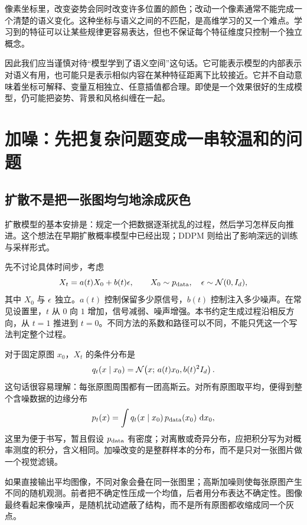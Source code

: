 像素坐标里，改变姿势会同时改变许多位置的颜色；改动一个像素通常不能完成一个清楚的语义变化。这种坐标与语义之间的不匹配，是高维学习的又一个难点。学习到的特征可以让某些规律更容易表达，但也不保证每个特征维度只控制一个独立概念。

因此我们应当谨慎对待“模型学到了语义空间”这句话。它可能表示模型的内部表示对语义有用，也可能只是表示相似内容在某种特征距离下比较接近。它并不自动意味着坐标可解释、变量互相独立、任意插值都合理。即使是一个效果很好的生成模型，仍可能把姿势、背景和风格纠缠在一起。

\section{加噪：先把复杂问题变成一串较温和的问题}
\label{sec:c-noising}

\subsection{扩散不是把一张图均匀地涂成灰色}

扩散模型的基本安排是：规定一个把数据逐渐扰乱的过程，然后学习怎样反向推进。这个想法在早期扩散概率模型中已经出现；DDPM 则给出了影响深远的训练与采样形式。\cite{c_sohl2015diffusion,r_ddpm}

先不讨论具体时间步，考虑
\begin{equation}
  X_t=a(t)X_0+b(t)\epsilon,\qquad
  X_0\sim p_{\mathrm{data}},\quad \epsilon\sim\mathcal{N}(0,I_d),
  \label{eq:c-noising}
\end{equation}
其中 $X_0$ 与 $\epsilon$ 独立。$a(t)$ 控制保留多少原信号，$b(t)$ 控制注入多少噪声。在常见设置里，$t$ 从 $0$ 向 $1$ 增加，信号减弱、噪声增强。本书约定生成过程沿相反方向，从 $t=1$ 推进到 $t=0$。不同方法的系数和路径可以不同，不能只凭这一个写法判定整个过程。

对于固定原图 $x_0$，$X_t$ 的条件分布是
\[
 q_t(x\mid x_0)=\mathcal{N}\!\left(x;\,a(t)x_0,b(t)^2I_d\right).
\]
这句话很容易理解：每张原图周围都有一团高斯云。对所有原图取平均，便得到整个含噪数据的边缘分布
\begin{equation}
 p_t(x)=\int q_t(x\mid x_0)\,p_{\mathrm{data}}(x_0)\,\mathop{}\!\mathrm{d} x_0,
 \label{eq:c-mixture}
\end{equation}
这里为便于书写，暂且假设 $p_{\mathrm{data}}$ 有密度；对离散或奇异分布，应把积分写为对概率测度的积分，含义相同。加噪改变的是整群样本的分布，而不是只对一张图片做一个视觉滤镜。

如果直接输出平均图像，不同对象会叠在同一张图里；高斯加噪则使每张原图产生不同的随机观测。前者把不确定性压成一个均值，后者用分布表达不确定性。图像最终看起来像噪声，是随机扰动遮蔽了结构，而不是所有原图都收缩成同一个灰点。

